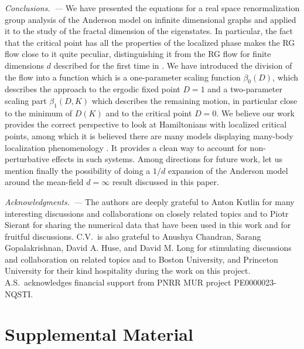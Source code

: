 \documentclass[reprint,aps,prl,superscriptaddress,english,nolongbibliography]{revtex4-2}
\begin{document}
{\emph{Conclusions.~---} We have presented the equations for a real space renormalization group analysis of the Anderson model on infinite dimensional graphs and applied it to the study of the fractal dimension of the eigenstates. In particular, the fact that the critical point has all the properties of the localized phase makes the RG flow close to it quite peculiar, distinguishing it from the RG flow for finite dimensions $d$ described for the first time in \cite{abrahams1979scaling}. We have introduced the division of the flow into a function which is a one-parameter scaling function $\beta_0(D)$, which describes the approach to the ergodic fixed point $D=1$ and a two-parameter scaling part $\beta_1(D,K)$ which describes the remaining motion, in particular close to the minimum of $D(K)$ and to the critical point $D=0$. We believe our work provides the correct perspective to look at Hamiltonians with localized critical points, among which it is believed there are many models displaying many-body localization phenomenology \cite{Deluca13}. It provides a clean way to account for non-perturbative effects in such systems. Among directions for future work, let us mention finally the possibility of doing a $1/d$ expansion of the Anderson model around the mean-field $d=\infty$ result discussed in this paper.

\begin{acknowledgments}

\emph{Acknowledgments.~---}
The authors are deeply grateful to Anton Kutlin for many interesting discussions and collaborations on closely related topics and to Piotr Sierant for sharing the numerical data that have been used in this work and for fruitful discussions.
C.V.\ is also grateful to Anushya Chandran, Sarang Gopalakrishnan, David A. Huse, and David M. Long for stimulating discussions and collaboration on related topics and to Boston University, and Princeton University for their kind hospitality during the work on this project. A.S.\ acknowledges financial support from PNRR MUR project PE0000023-NQSTI.
 

\end{acknowledgments}



\pagebreak
\widetext

\section{Supplemental Material}

}
\end{document}

